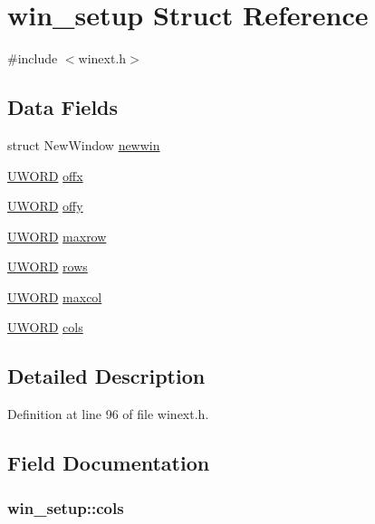 \hypertarget{structwin__setup}{\section{win\+\_\+setup Struct Reference}
\label{structwin__setup}
}


{\ttfamily \#include $<$winext.\+h$>$}

\subsection*{Data Fields}
\begin{DoxyCompactItemize}
\item 
struct New\+Window \hyperlink{structwin__setup_a274eccbc444f827a7db33a83c4f4ec70}{newwin}
\item 
\hyperlink{bitmfile_8h_a0428171499a4ab7aebc2bf058ae337df}{U\+W\+O\+R\+D} \hyperlink{structwin__setup_a69b3eb368183c34f4654d7d27ed28612}{offx}
\item 
\hyperlink{bitmfile_8h_a0428171499a4ab7aebc2bf058ae337df}{U\+W\+O\+R\+D} \hyperlink{structwin__setup_a8ec99922b532540feb6b9d06ab55b07c}{offy}
\item 
\hyperlink{bitmfile_8h_a0428171499a4ab7aebc2bf058ae337df}{U\+W\+O\+R\+D} \hyperlink{structwin__setup_aa8dc4df6c1d1b3ba409d0b81d3bb3f94}{maxrow}
\item 
\hyperlink{bitmfile_8h_a0428171499a4ab7aebc2bf058ae337df}{U\+W\+O\+R\+D} \hyperlink{structwin__setup_a5f88ce5b7935c39153a152283bed6058}{rows}
\item 
\hyperlink{bitmfile_8h_a0428171499a4ab7aebc2bf058ae337df}{U\+W\+O\+R\+D} \hyperlink{structwin__setup_a672999163c8dad3dd4e1a68bc8ec2604}{maxcol}
\item 
\hyperlink{bitmfile_8h_a0428171499a4ab7aebc2bf058ae337df}{U\+W\+O\+R\+D} \hyperlink{structwin__setup_a99dbe26f282b1a7d7f1c99a0a4bea053}{cols}
\end{DoxyCompactItemize}


\subsection{Detailed Description}


Definition at line 96 of file winext.\+h.



\subsection{Field Documentation}
\hypertarget{structwin__setup_a99dbe26f282b1a7d7f1c99a0a4bea053}{
\subsubsection[{cols}]{ win\+\_\+setup\+::cols}}\label{structwin__setup_a99dbe26f282b1a7d7f1c99a0a4bea053}


